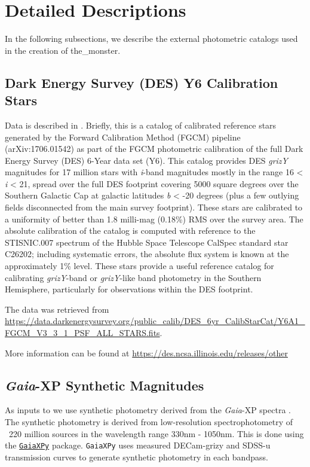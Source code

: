 \section{Detailed Descriptions}
\label{sec:details}
In the following subsections, we describe the external photometric catalogs used in the creation of the\_monster.

\subsection{Dark Energy Survey (DES) Y6 Calibration Stars}
\label{sec:des}
Data is described in \citep{2023arXiv230501695R}.
Briefly, this is a catalog of calibrated reference stars generated by the Forward Calibration Method (FGCM) pipeline (arXiv:1706.01542) as part of the FGCM photometric calibration of the full Dark Energy Survey (DES) 6-Year data set (Y6). This catalog provides DES \textit{grizY} magnitudes for 17 million stars with \textit{i}-band magnitudes mostly in the range 16 < \textit{i} < 21, spread over the full DES footprint covering 5000 square degrees over the Southern Galactic Cap at galactic latitudes \textit{b} < -20 degrees (plus a few outlying fields disconnected from the main survey footprint). 
These stars are calibrated to a uniformity of better than 1.8 milli-mag (0.18\%) RMS over the survey area. 
The absolute calibration of the catalog is computed with reference to the STISNIC.007 spectrum of the Hubble Space Telescope CalSpec standard star C26202; including systematic errors, the absolute flux system is known at the approximately 1\% level. 
These stars provide a useful reference catalog for calibrating \textit{grizY}-band or \textit{grizY}-like band photometry in the Southern Hemisphere, particularly for observations within the DES footprint.

The data was retrieved from \url{https://data.darkenergysurvey.org/public_calib/DES_6yr_CalibStarCat/Y6A1_FGCM_V3_3_1_PSF_ALL_STARS.fits}.

More information can be found at \url{https://des.ncsa.illinois.edu/releases/other}


\subsection{\emph{Gaia}-XP Synthetic Magnitudes}
\label{sec:gaiaxp}
As inputs to \monster we use synthetic photometry derived from the \emph{Gaia}-XP spectra \citep{2023A&A...674A..33G}. 
The synthetic photometry is derived from low-resolution spectrophotometry of ~220 million sources in the wavelength range 330nm - 1050nm. 
This is done using the \href{https://github.com/gaia-dpci/GaiaXPy/cd}{\texttt{GaiaXPy}} package. 
\texttt{GaiaXPy} uses measured DECam-grizy and SDSS-u transmission curves to generate synthetic photometry in each bandpass. 


